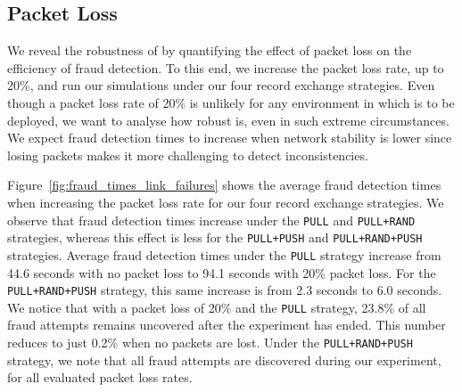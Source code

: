 \subsection{Packet Loss}
We reveal the robustness of \TrustChain{} by quantifying the effect of packet loss on the efficiency of fraud detection.
To this end, we increase the packet loss rate, up to 20\%, and run our simulations under our four record exchange strategies.
Even though a packet loss rate of 20\% is unlikely for any environment in which \TrustChain{} is to be deployed, we want to analyse how robust \TrustChain{} is, even in such extreme circumstances.
We expect fraud detection times to increase when network stability is lower since losing packets makes it more challenging to detect inconsistencies.

Figure~\ref{fig:fraud_times_link_failures} shows the average fraud detection times when increasing the packet loss rate for our four record exchange strategies.
We observe that fraud detection times increase under the \texttt{PULL} and \texttt{PULL+RAND} strategies, whereas this effect is less for the \texttt{PULL+PUSH} and \texttt{PULL+RAND+PUSH} strategies.
Average fraud detection times under the \texttt{PULL} strategy increase from 44.6 seconds with no packet loss to 94.1 seconds with 20\% packet loss.
For the \texttt{PULL+RAND+PUSH} strategy, this same increase is from 2.3 seconds to 6.0 seconds.
We notice that with a packet loss of 20\% and the \texttt{PULL} strategy, 23.8\% of all fraud attempts remains uncovered after the experiment has ended.
This number reduces to just 0.2\% when no packets are lost.
Under the \texttt{PULL+RAND+PUSH} strategy, we note that all fraud attempts are discovered during our experiment, for all evaluated packet loss rates.

